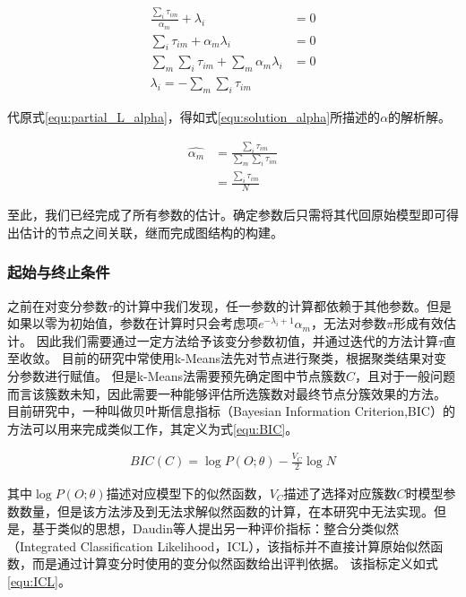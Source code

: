 \begin{equation}\begin{aligned}
\frac{\sum_i\tau_{im}}{\alpha_m}+\lambda_i&=0\\
\sum_i\tau_{im}+\alpha_m\lambda_i&=0\\
\sum_m\sum_i\tau_{im}+\sum_m\alpha_m\lambda_i&=0\\
\lambda_i=-\sum_m\sum_i\tau_{im}
\end{aligned}\end{equation}

代原式\ref{equ:partial_L_alpha}，得如式\ref{equ:solution_alpha}所描述的$\alpha$的解析解。

\begin{equation}\label{equ:solution_alpha}
  \begin{aligned}
\hat{\alpha_m}&=\frac{\sum_i\tau_{im}}{\sum_m\sum_i\tau_{im}}\\
&=\frac{\sum_i\tau_{im}}{N}
\end{aligned}\end{equation}

至此，我们已经完成了所有参数的估计。确定参数后只需将其代回原始模型即可得出估计的节点之间关联，继而完成图结构的构建。

\subsubsection{起始与终止条件}

之前在对变分参数$\tau$的计算中我们发现，任一参数的计算都依赖于其他参数。但是如果以零为初始值，参数在计算时只会考虑项$e^{-\lambda_i+1}\alpha_m$，无法对参数$\pi$形成有效估计。
因此我们需要通过一定方法给予该变分参数初值，并通过迭代的方法计算$\tau$直至收敛。
目前的研究中常使用k-Means法\cite{haj_estimation_2020}先对节点进行聚类，根据聚类结果对变分参数进行赋值。
但是k-Means法需要预先确定图中节点簇数$C$，且对于一般问题而言该簇数未知，因此需要一种能够评估所选簇数对最终节点分簇效果的方法。
目前研究中，一种叫做贝叶斯信息指标（Bayesian Information Criterion,BIC）\cite{schwarz_estimating_1978}的方法可以用来完成类似工作，其定义为式\ref{equ:BIC}。

\begin{equation}\label{equ:BIC}
  \begin{aligned}
    BIC(C)=\log P(O;\theta)-\frac{V_C}{2}\log N
\end{aligned}\end{equation}

其中$\log P(O;\theta)$描述对应模型下的似然函数，$V_C$描述了选择对应簇数$C$时模型参数数量，但是该方法涉及到无法求解似然函数的计算，在本研究中无法实现。但是，基于类似的思想，Daudin等人提出另一种评价指标：整合分类似然（Integrated Classification Likelihood，ICL）\cite{daudin_mixture_2008}，该指标并不直接计算原始似然函数，而是通过计算变分时使用的变分似然函数给出评判依据。
该指标定义如式\ref{equ:ICL}。

